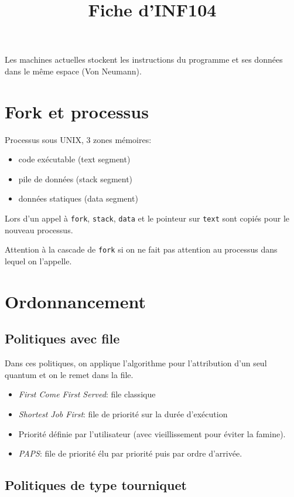 \documentclass[9pt,a4paper,twocolumn]{article}
\title{\vspace{-1.1cm} \textbf{Fiche d'INF104} \vspace{-1.1cm}}
\author{}
\date{}
\begin{document}
\maketitle

    Les machines actuelles stockent les instructions du programme et ses données dans le même espace (Von Neumann).


\section{Fork et processus}

    Processus sous {UNIX}, 3 zones mémoires:
    \begin{itemize}
        \item code exécutable (text segment)
        \item pile de données (stack segment)
        \item données statiques (data segment)
    \end{itemize}

    Lors d'un appel à \texttt{fork}, \texttt{stack}, \texttt{data} et le pointeur sur \texttt{text} sont copiés pour le nouveau processus.

    Attention à la cascade de \texttt{fork} si on ne fait pas attention au processus dans lequel on l'appelle.


\section{Ordonnancement}

    \subsection{Politiques avec file}
    Dans ces politiques, on applique l'algorithme pour l'attribution d'un seul quantum et on le remet dans la file.
    \begin{itemize}
        \item \emph{First Come First Served}: file classique
        \item \emph{Shortest Job First}: file de priorité sur la durée d'exécution 
        \item \emph{} Priorité définie par l'utilisateur (avec vieillissement pour éviter la famine).
        \item \emph{PAPS}: file de priorité élu par priorité puis par ordre d'arrivée.
    \end{itemize}

    \subsection{Politiques de type tourniquet}
\end{document}
